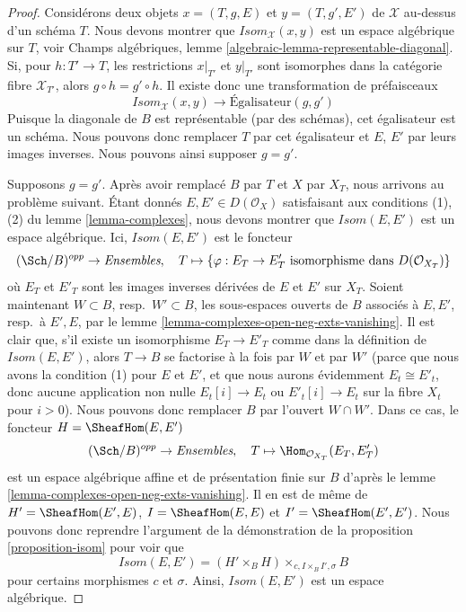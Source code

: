 \begin{proof}
Considérons deux objets $x = (T, g, E)$ et $y = (T, g', E')$ de
$\mathcal{X}$ au-dessus d'un schéma $T$. Nous devons montrer que
$\mathit{Isom}_\mathcal{X}(x, y)$ est un espace algébrique sur $T$, voir
Champs algébriques, lemme \ref{algebraic-lemma-representable-diagonal}.
Si, pour $h : T' \to T$, les restrictions $x|_{T'}$ et $y|_{T'}$ sont
isomorphes dans la catégorie fibre $\mathcal{X}_{T'}$, alors
$g \circ h = g' \circ h$.
Il existe donc une transformation de préfaisceaux
$$
\mathit{Isom}_\mathcal{X}(x, y) \longrightarrow \text{Égalisateur}(g, g')
$$
Puisque la diagonale de $B$ est représentable (par des schémas), cet égalisateur
est un schéma. Nous pouvons donc remplacer $T$ par cet égalisateur et $E$, $E'$
par leurs images inverses. Nous pouvons ainsi supposer $g = g'$.

\medskip\noindent
Supposons $g = g'$. Après avoir remplacé $B$ par $T$ et $X$ par $X_T$, nous
arrivons au problème suivant. Étant donnés $E, E' \in D(\mathcal{O}_X)$
satisfaisant aux conditions (1), (2) du lemme \ref{lemma-complexes}, nous devons
montrer que $\mathit{Isom}(E, E')$ est un espace algébrique.
Ici, $\mathit{Isom}(E, E')$ est le foncteur
$$
(\Sch/B)^{opp} \to \textit{Ensembles},\quad
T \mapsto \{\varphi : E_T \to E'_T
\text{ isomorphisme dans }D(\mathcal{O}_{X_T})\}
$$
où $E_T$ et $E'_T$ sont les images inverses dérivées de $E$ et $E'$ sur
$X_T$. Soient maintenant $W \subset B$, resp.\ $W' \subset B$, les sous-espaces
ouverts de $B$ associés à $E, E'$, resp.\ à $E', E$, par le
lemme \ref{lemma-complexes-open-neg-exts-vanishing}.
Il est clair que, s'il existe un isomorphisme $E_T \to E'_T$ comme dans la
définition de $\mathit{Isom}(E, E')$, alors $T \to B$ se factorise à la fois
par $W$ et par $W'$ (parce que nous avons la condition (1) pour $E$ et $E'$, et
que nous aurons évidemment $E_t \cong E'_t$, donc aucune application non nulle
$E_t[i] \to E_t$ ou $E'_t[i] \to E_t$ sur la fibre $X_t$ pour $i > 0$).
Nous pouvons donc remplacer $B$ par l'ouvert $W \cap W'$.
Dans ce cas, le foncteur $H = \SheafHom(E, E')$
$$
(\Sch/B)^{opp} \to \textit{Ensembles},\quad T \mapsto
\Hom_{\mathcal{O}_{X_T}}(E_T, E'_T)
$$
est un espace algébrique affine et de présentation finie sur $B$ d'après le
lemme \ref{lemma-complexes-open-neg-exts-vanishing}.
Il en est de même de
$H' = \SheafHom(E', E)$,
$I = \SheafHom(E, E)$ et
$I' = \SheafHom(E', E')$.
Nous pouvons donc reprendre l'argument de la démonstration de la
proposition \ref{proposition-isom} pour voir que
$$
\mathit{Isom}(E, E') = (H' \times_B H) \times_{c, I \times_B I', \sigma} B
$$
pour certains morphismes $c$ et $\sigma$. Ainsi,
$\mathit{Isom}(E, E')$ est un espace algébrique.
\end{proof}

